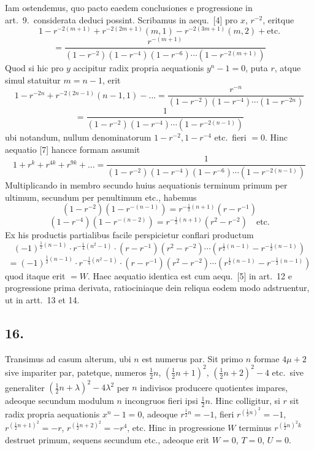 \documentclass[12pt,a4paper]{article}
\theoremstyle{plain}
\begin{document}
Iam ostendemus, quo pacto eaedem conclusiones e progressione in art.\ 9.\ considerata deduci possint. Scribamus in aequ.\ [4] pro $x$, $r^{-2}$, eritque
\[
1 - r^{-2(m+1)} + r^{-2(2m+1)}(m, 1) - r^{-2(3m+1)}(m, 2) + \text{etc.}
\]
\[
= \frac{r^{-(m+1)}}{(1-r^{-2})(1-r^{-4})(1-r^{-6}) \cdots (1-r^{-2(m+1)})}
\]
Quod si hic pro $y$ accipitur radix propria aequationis $y^n - 1 = 0$, puta $r$, atque simul statuitur $m = n-1$, erit
\[
1 - r^{-2n} + r^{-2(2n-1)}(n-1, 1) - \ldots = \frac{r^{-n}}{(1-r^{-2})(1-r^{-4}) \cdots (1-r^{-2n})}
\]
\[
= \frac{1}{(1-r^{-2})(1-r^{-4}) \cdots (1-r^{-2(n-1)})}
\]
ubi notandum, nullum denominatorum $1-r^{-2}, 1-r^{-4}$ etc.\ fieri $= 0$. Hinc aequatio [7] hancce formam assumit
\[
1 + r^{k} + r^{4k} + r^{9k} + \ldots = \frac{1}{(1-r^{-2})(1-r^{-4})(1-r^{-6}) \cdots (1-r^{-2(n-1)})}
\]
Multiplicando in membro secundo huius aequationis terminum primum per ultimum, secundum per penultimum etc., habemus
\[
(1-r^{-2})(1-r^{-(n-1)}) = r^{-\frac{1}{2}(n+1)}(r-r^{-1})
\]
\[
(1-r^{-4})(1-r^{-(n-2)}) = r^{-\frac{1}{2}(n+1)}(r^2-r^{-2}) \quad \text{etc.}
\]
Ex his productis partialibus facile perspicietur conflari productum
\[
(-1)^{\frac{1}{2}(n-1)} \cdot r^{-\frac{1}{4}(n^2-1)} \cdot (r-r^{-1})(r^2-r^{-2}) \cdots (r^{\frac{1}{2}(n-1)} - r^{-\frac{1}{2}(n-1)})
\]
\[
= (-1)^{\frac{1}{2}(n-1)} \cdot r^{-\frac{1}{4}(n^2-1)} \cdot (r-r^{-1})(r^2-r^{-2}) \cdots (r^{\frac{1}{2}(n-1)} - r^{-\frac{1}{2}(n-1)})
\]
quod itaque erit $= W$. Haec aequatio identica est cum aequ.\ [5] in art.\ 12 e progressione prima derivata, ratiociniaque dein reliqua eodem modo adstruentur, ut in artt.\ 13 et 14.

\subsection*{16.}

Transimus ad casum alterum, ubi $n$ est numerus par. Sit primo $n$ formae $4\mu+2$ sive impariter par, patetque, numeros $\frac{1}{2}n$, $(\frac{1}{2}n+1)^2$, $(\frac{1}{2}n+2)^2 - 4$ etc.\ sive generaliter $(\frac{1}{2}n+\lambda)^2 - 4\lambda^2$ per $n$ indivisos producere quotientes impares, adeoque secundum modulum $n$ incongruos fieri ipsi $\frac{1}{2}n$. Hinc colligitur, si $r$ sit radix propria aequationis $x^n - 1 = 0$, adeoque $r^{\frac{1}{2}n} = -1$, fieri $r^{(\frac{1}{2}n)^2} = -1$, $r^{(\frac{1}{2}n+1)^2} = -r$, $r^{(\frac{1}{2}n+2)^2} = -r^4$, etc. Hinc in progressione $W$ terminus $r^{(\frac{1}{2}n)^2 k}$ destruet primum, sequens secundum etc., adeoque erit $W = 0$, $T = 0$, $U = 0$.
\end{document}
